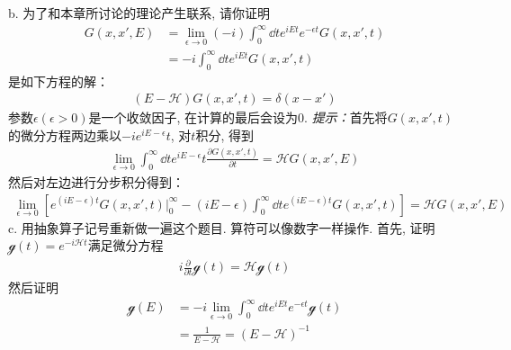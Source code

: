 {\noindent b. 为了和本章所讨论的理论产生联系, 请你证明
\begin{align*}
G(x,x',E) & = \lim_{\epsilon\to0}(-i) \int_0^\infty\dd t e^{iEt}e^{-\epsilon t} G(x,x',t)\\
          & = -i \int_{0}^{\infty}\dd t e^{iEt}G(x,x',t)
\end{align*}
是如下方程的解：
\begin{align*}
(E-\mathscr{H})G(x,x',t) = \delta(x - x')
\end{align*}
参数$\epsilon(\epsilon>0)$是一个收敛因子, 
在计算的最后会设为$0$. 
\textit{提示：}首先将$G(x,x',t)$的微分方程两边乘以$-ie^{iE-\epsilon}t$, 
对$t$积分, 
得到
\begin{align*}
\lim\limits_{\epsilon\to 0} \int_0^\infty\dd t e^{iE-\epsilon}t \frac{\partial G(x,x',t)}{\partial t} = \mathscr{H} G(x,x',E)
\end{align*}
然后对左边进行分步积分得到：
\begin{align*}
\lim\limits_{\epsilon\to 0} \left[ e^{(iE-\epsilon)t}G(x,x',t)\Big|_0^\infty - (iE-\epsilon)\int_{0}^{\infty}\dd t e^{(iE-\epsilon)t}G(x,x',t) \right] = \mathscr{H} G(x,x',E)
\end{align*}
\noindent c. 用抽象算子记号重新做一遍这个题目. 算符可以像数字一样操作. 首先, 证明$\mathscr{g}(t) = e^{-i\mathscr{H}t}$满足微分方程
\begin{align*}
i\frac{\partial}{\partial t}\mathscr{g}(t) = \mathscr{Hg}(t)
\end{align*}
然后证明
\begin{align*}
\mathscr{g}(E) &= -i\lim\limits_{\epsilon\to 0}\int_{0}^{\infty} \dd t e^{iEt} e^{-\epsilon t}\mathscr{g}(t)\\
             & = \frac{1}{E-\mathscr{H}} = (E-\mathscr{H})^{-1}
\end{align*}
}

